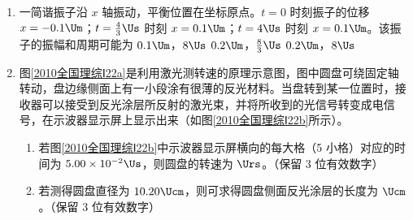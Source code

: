 \documentclass[\gkver]{gaokaozhenti}
\begin{document}
\begin{enumerate}
\item
一简谐振子沿 $x$ 轴振动，平衡位置在坐标原点。$t = 0$ 时刻振子的位移 $x = -0.1\Um$；$t = \frac{4}{3}\Us$ 时刻 $x = 0.1\Um$；$t = 4\Us$ 时刻 $x = 0.1\Um$。该振子的振幅和周期可能为
{$0.1\Um$，$8\Us$}
{$0.2\Um$，$\frac{8}{3}\Us$}
{$0.2\Um$，$8\Us$}

\item
图\ref{2010全国理综Ⅰ22a}是利用激光测转速的原理示意图，图中圆盘可绕固定轴转动，盘边缘侧面上有一小段涂有很薄的反光材料。当盘转到某一位置时，接收器可以接受到反光涂层所反射的激光束，并将所收到的光信号转变成电信号，在示波器显示屏上显示出来（如图\ref{2010全国理综Ⅰ22b}所示）。


\begin{enumerate}
	\item
	若图\ref{2010全国理综Ⅰ22b}中示波器显示屏横向的每大格（5 小格）对应的时间为 $5.00\times10^{-2}\Us$，则圆盘的转速为 $\Urs$。（保留 3 位有效数字）

	\item
	若测得圆盘直径为 $10.20\Ucm$，则可求得圆盘侧面反光涂层的长度为 $\Ucm$。（保留 3 位有效数字）

\end{enumerate}
\jdanswer{
\begin{enumerate}
	\item
	$4.55\Urs$


\end{enumerate}}
\end{enumerate}
\end{document}
